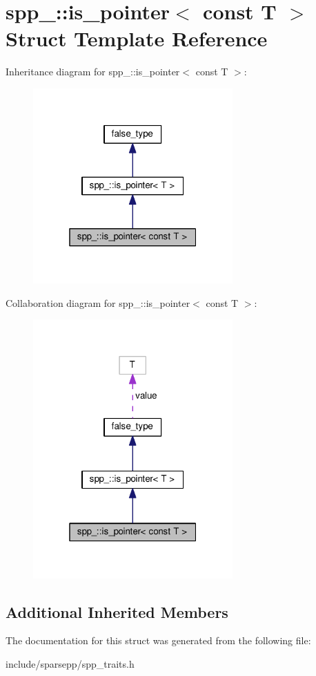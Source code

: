 \hypertarget{structspp___1_1is__pointer_3_01const_01_t_01_4}{}\section{spp\+\_\+\+:\+:is\+\_\+pointer$<$ const T $>$ Struct Template Reference}
\label{structspp___1_1is__pointer_3_01const_01_t_01_4}


Inheritance diagram for spp\+\_\+\+:\+:is\+\_\+pointer$<$ const T $>$\+:\nopagebreak
\begin{figure}[H]
\begin{center}
\leavevmode
\includegraphics[width=217pt]{structspp___1_1is__pointer_3_01const_01_t_01_4__inherit__graph}
\end{center}
\end{figure}


Collaboration diagram for spp\+\_\+\+:\+:is\+\_\+pointer$<$ const T $>$\+:\nopagebreak
\begin{figure}[H]
\begin{center}
\leavevmode
\includegraphics[width=217pt]{structspp___1_1is__pointer_3_01const_01_t_01_4__coll__graph}
\end{center}
\end{figure}
\subsection*{Additional Inherited Members}


The documentation for this struct was generated from the following file\+:\begin{DoxyCompactItemize}
\item 
include/sparsepp/spp\+\_\+traits.\+h\end{DoxyCompactItemize}

